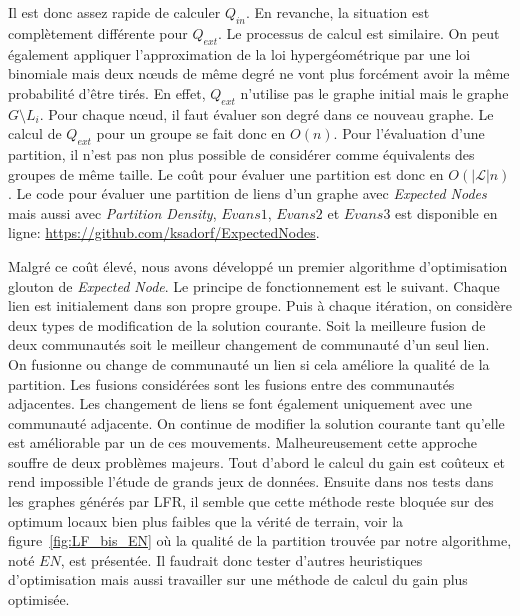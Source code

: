 Il est donc assez rapide de calculer $Q_{in}$.
En revanche, la situation est complètement différente pour $Q_{ext}$.
Le processus de calcul est similaire.
On peut également appliquer l'approximation de la loi hypergéométrique par une loi binomiale mais deux n\oe{}uds de même degré ne vont plus forcément avoir la même probabilité d'être tirés.
En effet, $Q_{ext}$ n'utilise pas le graphe initial mais le graphe $G\setminus L_i$.
Pour chaque n\oe{}ud, il faut évaluer son degré dans ce nouveau graphe.
Le calcul de $Q_{ext}$ pour un groupe se fait donc en $O(n)$.
Pour l'évaluation d'une partition, il n'est pas non plus possible de considérer comme équivalents des groupes de même taille.
Le coût pour évaluer une partition est donc en $O(|\mathcal{L}|n)$.
Le code pour évaluer une partition de liens d'un graphe avec \emph{Expected Nodes} mais aussi avec \emph{Partition Density}, $Evans1$, $Evans2$ et $Evans3$ est disponible en ligne: \url{https://github.com/ksadorf/ExpectedNodes}.


Malgré ce coût élevé, nous avons développé un premier algorithme d'optimisation glouton de \emph{Expected Node}.
Le principe de fonctionnement est le suivant.
Chaque lien est initialement dans son propre groupe.
Puis à chaque itération, on considère deux types de modification de la solution courante.
Soit la meilleure fusion de deux communautés soit le meilleur changement de communauté d'un seul lien.
On fusionne ou change de communauté un lien si cela améliore la qualité de la partition.
Les fusions considérées sont les fusions entre des communautés adjacentes.
Les changement de liens se font également uniquement avec une communauté adjacente.
On continue de modifier la solution courante tant qu'elle est améliorable par un de ces mouvements.
Malheureusement cette approche souffre de deux problèmes majeurs.
Tout d'abord le calcul du gain est coûteux et rend impossible l'étude de grands jeux de données.
Ensuite dans nos tests dans les graphes générés par LFR, il semble que cette méthode reste bloquée sur des optimum locaux bien plus faibles que la vérité de terrain, voir la figure~\ref{fig:LF_bis_EN} où la qualité de la partition trouvée par notre algorithme, noté $EN$, est présentée.
Il faudrait donc tester d'autres heuristiques d'optimisation mais aussi travailler sur une méthode de calcul du gain plus optimisée.

